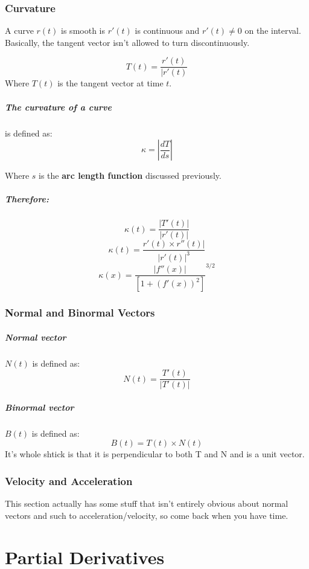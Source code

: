 \documentclass[a4paper,12pt]{report}
\begin{document}
\subsection{Curvature}
A curve $r(t)$ is smooth is $r'(t)$ is continuous and $r'(t) \neq 0$ on the interval. Basically, the tangent vector isn't allowed to turn discontinuously.

$$T(t) = \frac{r'(t)}{|r'(t)}$$
Where $T(t)$ is the tangent vector at time $t$. 

\paragraph{The curvature of a curve } is defined as:
$$\kappa = |\frac{dT}{ds}|$$

Where $s$ is the \textbf{arc length function} discussed previously.

\paragraph{Therefore: }
$$\kappa(t) = \frac{|T'(t)|}{|r'(t)|}$$
$$\kappa(t) = \frac{r'(t) \times r''(t)|}{|r'(t)|^3}$$
$$\kappa(x) = \frac{|f''(x)|}{[1+(f'(x))^2]}^{3/2}$$

\subsection{Normal and Binormal Vectors}
\paragraph{Normal vector } $N(t)$ is defined as: 
$$N(t) = \frac{T'(t)}{|T'(t)|}$$

\paragraph{Binormal vector } $B(t)$ is defined as:
$$B(t) = T(t) \times N(t)$$
It's whole shtick is that it is perpendicular to both T and N and is a unit vector.

\subsection{Velocity and Acceleration}
This section actually has some stuff that isn't entirely obvious about normal vectors and such to acceleration/velocity, so come back when you have time.

\chapter{Partial Derivatives}
\end{document}

